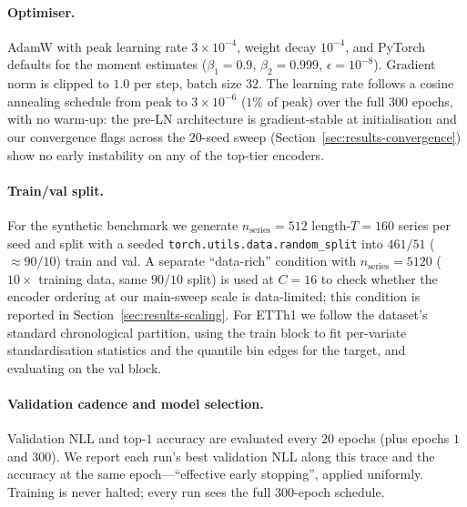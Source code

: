 \documentclass[11pt]{article}
\begin{document}
\paragraph{Optimiser.} AdamW with peak learning rate $3{\times}10^{-4}$,
weight decay $10^{-4}$, and PyTorch defaults for the moment
estimates ($\beta_1{=}0.9$, $\beta_2{=}0.999$,
$\epsilon{=}10^{-8}$). Gradient norm is clipped to $1.0$ per step,
batch size $32$. The learning rate follows a cosine annealing
schedule from peak to $3{\times}10^{-6}$ ($1\%$ of peak) over the
full $300$ epochs, with no warm-up: the pre-LN architecture
\citep{xiong2020layernorm} is gradient-stable at initialisation
and our convergence flags across the $20$-seed sweep
(Section~\ref{sec:results-convergence}) show no early instability
on any of the top-tier encoders.

\paragraph{Train/val split.}
For the synthetic benchmark we generate $n_{\text{series}}{=}512$
length-$T{=}160$ series per seed and split with a seeded
\texttt{torch.utils.data.random\_split} into
$461 / 51$ ($\approx 90/10$) train and val. A separate
``data-rich'' condition with $n_{\text{series}}{=}5120$
($10{\times}$ training data, same $90/10$ split) is used at $C{=}16$
to check whether the encoder ordering at our main-sweep scale is
data-limited; this condition is reported in
Section~\ref{sec:results-scaling}.
For ETTh1 we follow the dataset's standard chronological partition,
using the train block to fit per-variate standardisation statistics
and the quantile bin edges for the target, and evaluating on the
val block.

\paragraph{Validation cadence and model selection.} Validation
NLL and top-$1$ accuracy are evaluated every $20$ epochs (plus
epochs $1$ and $300$). We report each run's best validation NLL
along this trace and the accuracy at the same epoch---``effective
early stopping'', applied uniformly. Training is never halted;
every run sees the full $300$-epoch schedule.
\end{document}
